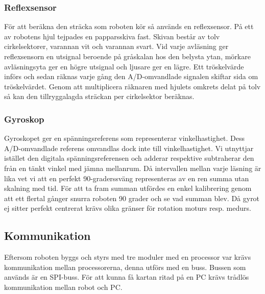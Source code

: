 \documentclass[a4paper,12pt,fleqn]{article}
\begin{document}
\subsubsection{Reflexsensor}
För att beräkna den sträcka som roboten kör så används en reflexsensor. På ett av robotens hjul tejpades en papparsskiva fast. Skivan består av tolv cirkelsektorer, varannan vit och varannan svart. Vid varje avläsning ger reflexsensorn en utsignal beroende på gråskalan hos den belysta ytan, mörkare avläsningsyta ger en högre utsignal och ljusare ger en lägre. Ett tröskelvärde införs och sedan räknas varje gång den A/D-omvandlade signalen skiftar sida om tröskelvärdet. Genom att multiplicera räknaren med hjulets omkrets delat på tolv så kan den tillryggalagda sträckan per cirkelsektor beräknas.

\subsubsection{Gyroskop}
Gyroskopet ger en spänningsreferens som representerar vinkelhastighet. Dess A/D-omvandlade referens omvandlas dock inte till vinkelhastighet. Vi utnyttjar istället den digitala spänningsreferensen och adderar respektive subtraherar den från en tänkt vinkel med jämna mellanrum. Då intervallen mellan varje läsning är lika vet vi att en perfekt 90-graderssväng representeras av en ren summa utan skalning med tid. För att ta fram summan utfördes en enkel kalibrering genom att ett flertal gånger snurra roboten 90 grader och se vad summan blev. Då gyrot ej sitter perfekt centrerat krävs olika gränser för rotation moturs resp. medurs. 


\newpage
\subsection{Kommunikation}
Eftersom roboten byggs och styrs med tre moduler med en processor var krävs kommunikation mellan processorerna, denna utförs med en buss. Bussen som används är en SPI-buss.
För att kunna få kartan ritad på en PC krävs trådlös kommunikation mellan robot och PC.
\end{document}
